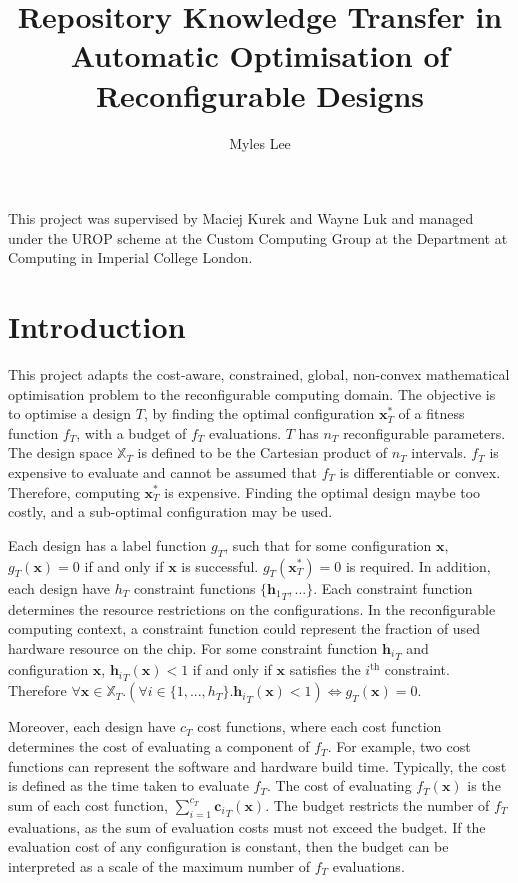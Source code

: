 \documentclass[10pt,a4paper]{article}
\author{Myles Lee}
\title{Repository Knowledge Transfer in Automatic Optimisation of Reconfigurable Designs}
\begin{document}
\maketitle
This project was supervised by Maciej Kurek and Wayne Luk and managed under the UROP scheme at the Custom Computing Group at the Department at Computing in Imperial College London.

\tableofcontents

\section{Introduction}
This project adapts the cost-aware, constrained, global, non-convex mathematical optimisation problem to the reconfigurable computing domain. The objective is to optimise a design $T$, by finding the optimal configuration $\mathbf{x}_T^*$ of a fitness function $f_T$, with a budget of $f_T$ evaluations. $T$ has $n_T$ reconfigurable parameters. The design space $\mathbb{X}_T$ is defined to be the Cartesian product of $n_T$ intervals. $f_T$ is expensive to evaluate and cannot be assumed that $f_T$ is differentiable or convex. Therefore, computing $\mathbf{x}_T^*$ is expensive. Finding the optimal design maybe too costly, and a sub-optimal configuration may be used.

Each design has a label function $g_T$, such that for some configuration $\mathbf{x}$, $g_T(\mathbf{x})=0$ if and only if $\mathbf{x}$ is successful. $g_T(\mathbf{x}_T^*)=0$ is required. In addition, each design have $h_T$ constraint functions $\{{\mathbf{h}_1}_T,...\}$. Each constraint function determines the resource restrictions on the configurations. In the reconfigurable computing context, a constraint function could represent the fraction of used hardware resource on the chip. For some constraint function ${\mathbf{h}_i}_T$ and configuration $\mathbf{x}$, ${\mathbf{h}_i}_T(\mathbf{x})<1$ if and only if $\mathbf{x}$ satisfies the $i^{\text{th}}$ constraint. Therefore $\forall \mathbf{x}\in\mathbb{X}_T.(\forall i\in\{1,...,h_T\}.{\mathbf{h}_i}_T(\mathbf{x})<1)\Leftrightarrow g_T(\mathbf{x})=0$.

Moreover, each design have $c_T$ cost functions, where each cost function determines the cost of evaluating a component of $f_T$. For example, two cost functions can represent the software and hardware build time. Typically, the cost is defined as the time taken to evaluate $f_T$. The cost of evaluating $f_T(\mathbf{x})$ is the sum of each cost function, $\sum_{i=1}^{c_T}{\mathbf{c}_i}_T(\mathbf{x})$. The budget restricts the number of $f_T$ evaluations, as the sum of evaluation costs must not exceed the budget. If the evaluation cost of any configuration is constant, then the budget can be interpreted as a scale of the maximum number of $f_T$ evaluations.
\end{document}
